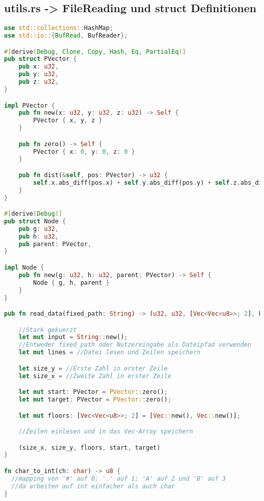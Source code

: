 \subsection{utils.rs -> FileReading und struct Definitionen}
\begin{lstlisting}[language=Rust, style=colouredRust]
use std::collections::HashMap;
use std::io::{BufRead, BufReader};

#[derive(Debug, Clone, Copy, Hash, Eq, PartialEq)]
pub struct PVector {
    pub x: u32,
    pub y: u32,
    pub z: u32,
}

impl PVector {
    pub fn new(x: u32, y: u32, z: u32) -> Self {
        PVector { x, y, z }
    }

    pub fn zero() -> Self {
        PVector { x: 0, y: 0, z: 0 }
    }

    pub fn dist(&self, pos: PVector) -> u32 {
        self.x.abs_diff(pos.x) + self.y.abs_diff(pos.y) + self.z.abs_diff(pos.z) * 3
    }
}

#[derive(Debug)]
pub struct Node {
    pub g: u32,
    pub h: u32,
    pub parent: PVector,
}

impl Node {
    pub fn new(g: u32, h: u32, parent: PVector) -> Self {
        Node { g, h, parent }
    }
}

pub fn read_data(fixed_path: String) -> (u32, u32, [Vec<Vec<u8>>; 2], PVector, PVector) {

    //Stark gekuerzt
    let mut input = String::new();
    //Entweder fixed_path oder Nutzereingabe als Dateipfad verwenden
    let mut lines = //Datei lesen und Zeilen speichern

    let size_y = //Erste Zahl in erster Zeile
    let size_x = //Zweite Zahl in erster Zeile

    let mut start: PVector = PVector::zero();
    let mut target: PVector = PVector::zero();

    let mut floors: [Vec<Vec<u8>>; 2] = [Vec::new(), Vec::new()];

    //Zeilen einlesen und in das Vec-Array speichern

    (size_x, size_y, floors, start, target)
}

fn char_to_int(ch: char) -> u8 {
  //mapping von '#' auf 0; '.' auf 1; 'A' auf 2 und 'B' auf 3
  //da arbeiten auf int einfacher als auch char
}

\end{lstlisting}
